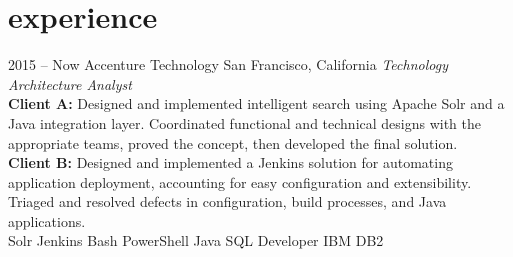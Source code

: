 \documentclass[]{friggeri-cv} %
\begin{document}
\section{experience}

\begin{entrylist}

 
\entry
{2015 -- Now}
{Accenture Technology}
{San Francisco, California}
{\emph{Technology Architecture Analyst} \\
    \textbf{Client A:} Designed and implemented intelligent search using Apache Solr and a Java integration layer. Coordinated functional and technical designs with the appropriate teams, proved the concept, then developed the final solution.
    \vspace{1mm}\\
    \textbf{Client B:} Designed and implemented a Jenkins solution for automating application deployment, accounting for easy configuration and extensibility. Triaged and resolved defects in configuration, build processes, and Java applications.\\
Solr \mydot Jenkins \mydot Bash \mydot PowerShell \mydot Java \mydot SQL Developer \mydot IBM DB2}



\end{entrylist}
\end{document}
